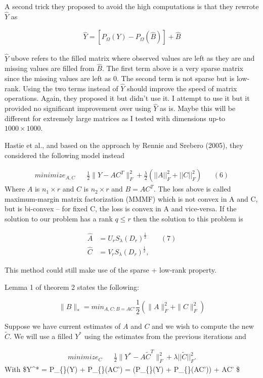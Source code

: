 \documentclass[
]{article}
\begin{document}
A second trick they proposed to avoid the high computations is that they
rewrote \(\hat{Y}\) as

\[
\begin{aligned}
\hat{Y} = [P_\Omega(Y) - P_\Omega(\hat{B})]  + \hat{B}
\end{aligned}
\]

\(\hat{Y}\) ubove refers to the filled matrix where observed values are
left as they are and missing values are filled from \(\hat{B}\). The
first term above is a very sparse matrix since the missing values are
left as 0. The second term is not sparse but is low-rank. Using the two
terms instead of \(\hat{Y}\) should improve the speed of matrix
operations. Again, they proposed it but didn't use it. I attempt to use
it but it provided no significant improvement over using \(\hat{Y}\) as
is. Maybe this will be different for extremely large matrices as I
tested with dimensions up-to \(1000\times 1000\).

Hastie et al., and based on the approach by Rennie and Srebero (2005),
they considered the following model instead

\[
\begin{aligned}
minimize_{A,C} && \frac{1}{2} \|Y-AC^T\|^2_F + \frac{\lambda}{2} (||A||^2_F+||C||^2_F)  && (6)
\end{aligned}
\] Where \(A\) is \(n_1\times r\) and \(C\) is \(n_2 \times r\) and
\(B=AC^T\). The loss above is called maximum-margin matrix factorization
(MMMF) which is not convex in A and C, but is bi-convex -- for fixed C,
the loss is convex in A and vice-versa. If the solution to our problem
has a rank \(q \le r\) then the solution to this problem is

\[
\begin{aligned}
\hat{A} &= U_r S_\lambda(D_r)^{\frac{1}{2}} && (7)\\
\hat{C} &= V_r S_\lambda(D_r)^{\frac{1}{2}}, &&
\end{aligned}
\]

This method could still make use of the sparse + low-rank property.

Lemma 1 of theorem 2 states the following:

\[
\| B\|_* = min_{A,C:B=AC'} \frac{1}{2}(\|A\|^2_F+\|C\|^2_F)
\]

Suppose we have current estimates of \(A\) and \(C\) and we wish to
compute the new \(\tilde{C}\). We will use a filled \(Y^*\) using the
estimates from the previous iterations and

\[
\begin{aligned}
minimize_{C} && \frac{1}{2} \|Y^*-A\tilde C^T\|^2_F + \lambda ||\tilde C||^2_F.
\end{aligned}
\] With \$Y\^{}* = P\_\{\Omega\}(Y) + P\_\{\overline \Omega\}(AC') =
(P\_\{\Omega\}(Y) + P\_\{\Omega\}(AC')) + AC' \$
\end{document}
